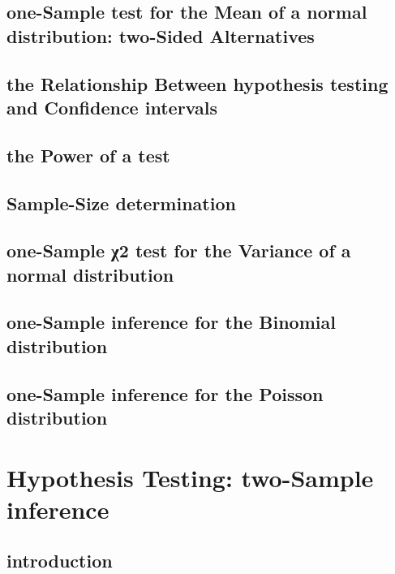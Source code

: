 \documentclass[12pt,]{article}
\theoremstyle{definition}
\theoremstyle{definition}
\theoremstyle{definition}
\theoremstyle{remark}
\begin{document}
\subsection{one-Sample test for the Mean of a normal distribution:
two-Sided
Alternatives}\label{one-sample-test-for-the-mean-of-a-normal-distribution-two-sided-alternatives}

\subsection{the Relationship Between hypothesis testing and Confidence
intervals}\label{the-relationship-between-hypothesis-testing-and-confidence-intervals}

\subsection{the Power of a test}\label{the-power-of-a-test}

\subsection{Sample-Size determination}\label{sample-size-determination}

\subsection{one-Sample χ2 test for the Variance of a normal
distribution}\label{one-sample-2-test-for-the-variance-of-a-normal-distribution}

\subsection{one-Sample inference for the Binomial
distribution}\label{one-sample-inference-for-the-binomial-distribution}

\subsection{one-Sample inference for the Poisson
distribution}\label{one-sample-inference-for-the-poisson-distribution}

\section{Hypothesis Testing: two-Sample
inference}\label{hypothesis-testing-two-sample-inference}

\subsection{introduction}\label{introduction-6}
\end{document}
